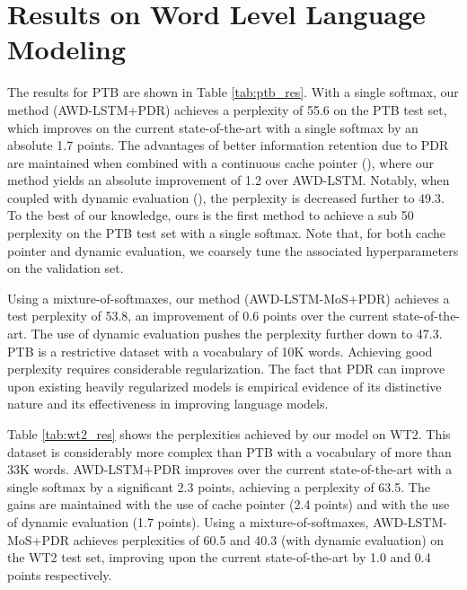 \documentclass{article} \usepackage{iclr2019_conference,times}
\begin{document}
\section{Results on Word Level Language Modeling} 

The results for PTB are shown in Table \ref{tab:ptb_res}. 
With a single softmax, our method (AWD-LSTM+PDR) achieves a perplexity of 55.6 on the PTB test set, which improves on the current state-of-the-art with a single softmax by an absolute 1.7 points. The advantages of better information retention due to PDR are maintained when combined with a continuous cache pointer (\cite{Grave2016ImprovingNL}), where our method yields an absolute improvement of 1.2 over AWD-LSTM. Notably, when coupled with dynamic evaluation (\cite{Krause2018DynamicEO}), the perplexity is decreased further to 49.3. To the best of our knowledge, ours is the first method to achieve a sub 50 perplexity on the PTB test set with a single softmax. Note that, for both cache pointer and dynamic evaluation, we coarsely tune the associated hyperparameters on the validation set.  

Using a mixture-of-softmaxes, our method (AWD-LSTM-MoS+PDR) achieves a test perplexity of 53.8, an improvement of 0.6 points over the current state-of-the-art. The use of dynamic evaluation pushes the perplexity further down to 47.3. 
PTB is a restrictive dataset with a  vocabulary of 10K words. Achieving good perplexity requires considerable regularization. The fact that PDR can improve upon  existing heavily regularized models is empirical evidence of its distinctive nature and its effectiveness in improving language models.  

Table \ref{tab:wt2_res} shows the perplexities achieved by  our model on  WT2. This dataset is considerably more complex than PTB with a vocabulary of more than 33K words. AWD-LSTM+PDR improves over the current state-of-the-art with a single softmax by a significant 2.3 points, achieving a perplexity of 63.5. The gains are maintained with the use of cache pointer (2.4 points) and with the use of  dynamic evaluation (1.7 points). Using a mixture-of-softmaxes,  AWD-LSTM-MoS+PDR achieves perplexities of 60.5 and 40.3 (with dynamic evaluation) on the WT2 test set, improving upon the current state-of-the-art by 1.0 and 0.4 points respectively. 
\end{document}
